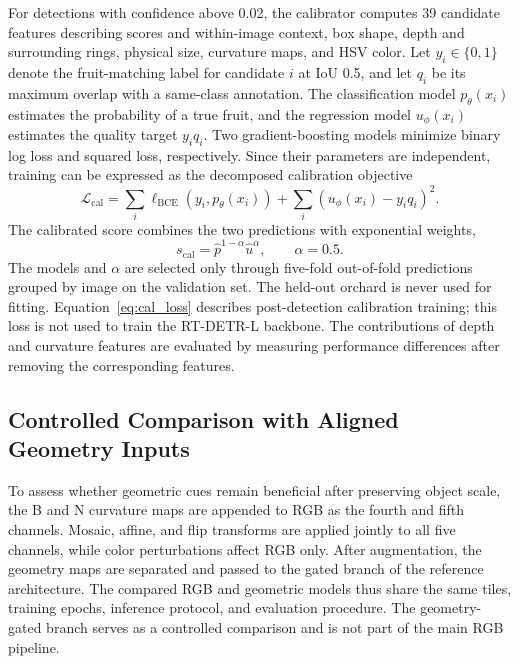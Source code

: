 \documentclass[11pt,a4paper]{article}
\begin{document}
For detections with confidence above 0.02, the calibrator computes 39 candidate features describing scores and within-image context, box shape, depth and surrounding rings, physical size, curvature maps, and HSV color. Let $y_i\in\{0,1\}$ denote the fruit-matching label for candidate $i$ at IoU 0.5, and let $q_i$ be its maximum overlap with a same-class annotation. The classification model $p_\theta(x_i)$ estimates the probability of a true fruit, and the regression model $u_\phi(x_i)$ estimates the quality target $y_iq_i$. Two gradient-boosting models \cite{lgbm} minimize binary log loss and squared loss, respectively. Since their parameters are independent, training can be expressed as the decomposed calibration objective
\begin{equation}
\mathcal{L}_{\mathrm{cal}}=\sum_i\ell_{\mathrm{BCE}}\!\left(y_i,p_\theta(x_i)\right)
+\sum_i\left(u_\phi(x_i)-y_iq_i\right)^2.
\label{eq:cal_loss}
\end{equation}
The calibrated score combines the two predictions with exponential weights,
\begin{equation}
s_{\mathrm{cal}}=\hat p^{1-\alpha}\hat u^{\alpha},\qquad \alpha=0.5.
\end{equation}
The models and $\alpha$ are selected only through five-fold out-of-fold predictions grouped by image on the validation set. The held-out orchard is never used for fitting. Equation~\eqref{eq:cal_loss} describes post-detection calibration training; this loss is not used to train the RT-DETR-L backbone. The contributions of depth and curvature features are evaluated by measuring performance differences after removing the corresponding features.

\subsection{Controlled Comparison with Aligned Geometry Inputs}
To assess whether geometric cues remain beneficial after preserving object scale, the B and N curvature maps are appended to RGB as the fourth and fifth channels. Mosaic, affine, and flip transforms are applied jointly to all five channels, while color perturbations affect RGB only. After augmentation, the geometry maps are separated and passed to the gated branch of the reference architecture. The compared RGB and geometric models thus share the same tiles, training epochs, inference protocol, and evaluation procedure. The geometry-gated branch serves as a controlled comparison and is not part of the main RGB pipeline.
\end{document}
